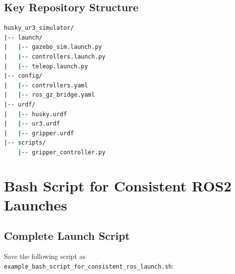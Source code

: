 \documentclass[11pt,a4paper]{article}
\begin{document}
\subsection{Key Repository Structure}
\begin{lstlisting}[language=bash, caption=Repository Structure]
husky_ur3_simulator/
|-- launch/
|   |-- gazebo_sim.launch.py
|   |-- controllers.launch.py
|   |-- teleop.launch.py
|-- config/
|   |-- controllers.yaml
|   |-- ros_gz_bridge.yaml
|-- urdf/
|   |-- husky.urdf
|   |-- ur3.urdf
|   |-- gripper.urdf
|-- scripts/
    |-- gripper_controller.py
\end{lstlisting}

\section{Bash Script for Consistent ROS2 Launches}

\subsection{Complete Launch Script}

Save the following script as \texttt{example\_bash\_script\_for\_consistent\_ros\_launch.sh}:
\end{document}
